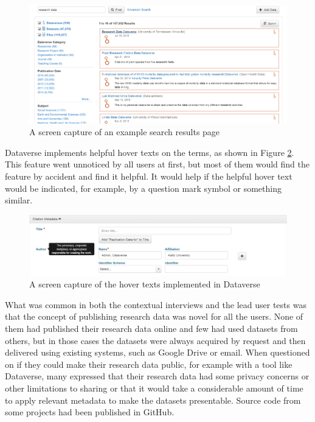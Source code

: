 \begin{figure}
    \begin{centering}
        \includegraphics[width=\textwidth]{images/search_results}
    \end{centering}
    \caption{A screen capture of an example search results page}
    \label{fig:search_results}
\end{figure}

Dataverse implements helpful hover texts on the terms, as shown in Figure
\ref{fig:hovertext}. This feature went unnoticed by all users at first, but
most of them would find the feature by accident and find it helpful. It would
help if the helpful hover text would be indicated, for example, by a question
mark symbol or something similar.

\begin{figure}
    \begin{centering}
        \includegraphics[width=\textwidth]{images/hovertext}
    \end{centering}
    \caption{A screen capture of the hover texts implemented in Dataverse}
    \label{fig:hovertext}
\end{figure}

What was common in both the contextual interviews and the lead user tests was
that the concept of publishing research data was novel for all the users. None
of them had published their research data online and few had used datasets from others,
but in those cases the datasets were always acquired by request and then
delivered using existing systems, such as Google Drive or email. When 
questioned on if they could make their research data public, for example with a tool
like Dataverse, many expressed that their research data had some privacy
concerns or other limitations to sharing or that it would take a considerable
amount of time to apply relevant metadata to make the datasets presentable.
Source code from some projects had been published in GitHub.

